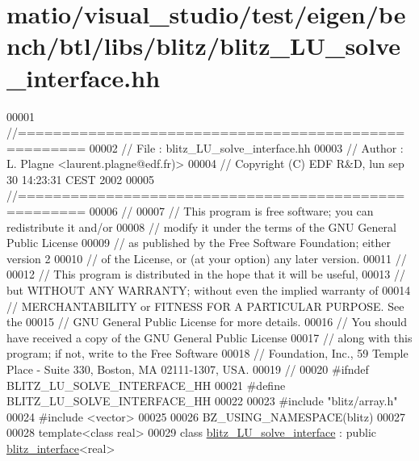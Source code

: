 \hypertarget{matio_2visual__studio_2test_2eigen_2bench_2btl_2libs_2blitz_2blitz___l_u__solve__interface_8hh_source}{}\section{matio/visual\+\_\+studio/test/eigen/bench/btl/libs/blitz/blitz\+\_\+\+L\+U\+\_\+solve\+\_\+interface.hh}
\label{matio_2visual__studio_2test_2eigen_2bench_2btl_2libs_2blitz_2blitz___l_u__solve__interface_8hh_source}

\begin{DoxyCode}
00001 \textcolor{comment}{//=====================================================}
00002 \textcolor{comment}{// File   :  blitz\_LU\_solve\_interface.hh}
00003 \textcolor{comment}{// Author :  L. Plagne <laurent.plagne@edf.fr)>        }
00004 \textcolor{comment}{// Copyright (C) EDF R&D,  lun sep 30 14:23:31 CEST 2002}
00005 \textcolor{comment}{//=====================================================}
00006 \textcolor{comment}{// }
00007 \textcolor{comment}{// This program is free software; you can redistribute it and/or}
00008 \textcolor{comment}{// modify it under the terms of the GNU General Public License}
00009 \textcolor{comment}{// as published by the Free Software Foundation; either version 2}
00010 \textcolor{comment}{// of the License, or (at your option) any later version.}
00011 \textcolor{comment}{// }
00012 \textcolor{comment}{// This program is distributed in the hope that it will be useful,}
00013 \textcolor{comment}{// but WITHOUT ANY WARRANTY; without even the implied warranty of}
00014 \textcolor{comment}{// MERCHANTABILITY or FITNESS FOR A PARTICULAR PURPOSE.  See the}
00015 \textcolor{comment}{// GNU General Public License for more details.}
00016 \textcolor{comment}{// You should have received a copy of the GNU General Public License}
00017 \textcolor{comment}{// along with this program; if not, write to the Free Software}
00018 \textcolor{comment}{// Foundation, Inc., 59 Temple Place - Suite 330, Boston, MA  02111-1307, USA.}
00019 \textcolor{comment}{// }
00020 \textcolor{preprocessor}{#ifndef BLITZ\_LU\_SOLVE\_INTERFACE\_HH}
00021 \textcolor{preprocessor}{#define BLITZ\_LU\_SOLVE\_INTERFACE\_HH}
00022 
00023 \textcolor{preprocessor}{#include "blitz/array.h"}
00024 \textcolor{preprocessor}{#include <vector>}
00025 
00026 BZ\_USING\_NAMESPACE(blitz)
00027 
00028 \textcolor{keyword}{template}<\textcolor{keyword}{class} real>
00029 \textcolor{keyword}{class }\hyperlink{classblitz___l_u__solve__interface}{blitz\_LU\_solve\_interface} : \textcolor{keyword}{public} \hyperlink{classblitz__interface}{blitz\_interface}<real>

\end{DoxyCode}
